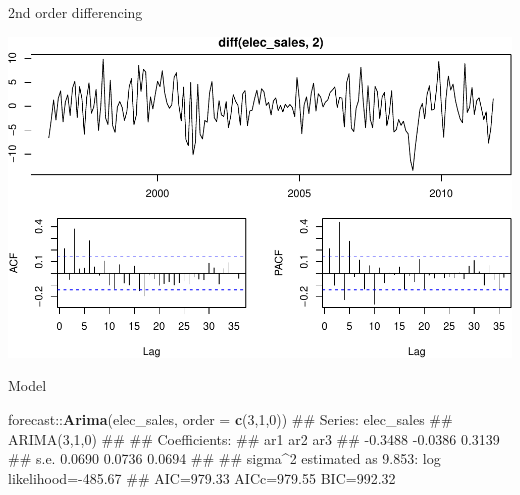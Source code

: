 \documentclass[11pt,ignorenonframetext,]{beamer}
\newenvironment{Shaded}{}{}
\newcommand{\DataTypeTok}[1]{\textcolor[rgb]{0.56,0.13,0.00}{#1}}
\newcommand{\DecValTok}[1]{\textcolor[rgb]{0.25,0.63,0.44}{#1}}
\newcommand{\KeywordTok}[1]{\textcolor[rgb]{0.00,0.44,0.13}{\textbf{#1}}}
\newcommand{\NormalTok}[1]{#1}
\newcommand{\OperatorTok}[1]{\textcolor[rgb]{0.40,0.40,0.40}{#1}}
\let\oldShaded\Shaded
\let\endoldShaded\endShaded
\renewenvironment{Shaded}{\footnotesize\begin{spacing}{0.9}\oldShaded}{\endoldShaded\end{spacing}}
\begin{document}
\begin{frame}{%
\protect\hypertarget{nd-order-differencing}{%
2nd order differencing}}

\begin{center}\includegraphics[width=\textwidth]{Lec09_files/figure-beamer/unnamed-chunk-24-1} \end{center}

\end{frame}

\begin{frame}[fragile,t]{%
\protect\hypertarget{model}{%
Model}}

\begin{Shaded}
\begin{Highlighting}[]
\NormalTok{forecast}\OperatorTok{::}\KeywordTok{Arima}\NormalTok{(elec_sales, }\DataTypeTok{order =} \KeywordTok{c}\NormalTok{(}\DecValTok{3}\NormalTok{,}\DecValTok{1}\NormalTok{,}\DecValTok{0}\NormalTok{))}
\NormalTok{## Series: elec_sales }
\NormalTok{## ARIMA(3,1,0) }
\NormalTok{## }
\NormalTok{## Coefficients:}
\NormalTok{##           ar1      ar2     ar3}
\NormalTok{##       -0.3488  -0.0386  0.3139}
\NormalTok{## s.e.   0.0690   0.0736  0.0694}
\NormalTok{## }
\NormalTok{## sigma^2 estimated as 9.853:  log likelihood=-485.67}
\NormalTok{## AIC=979.33   AICc=979.55   BIC=992.32}
\end{Highlighting}
\end{Shaded}

\end{frame}
\end{document}
